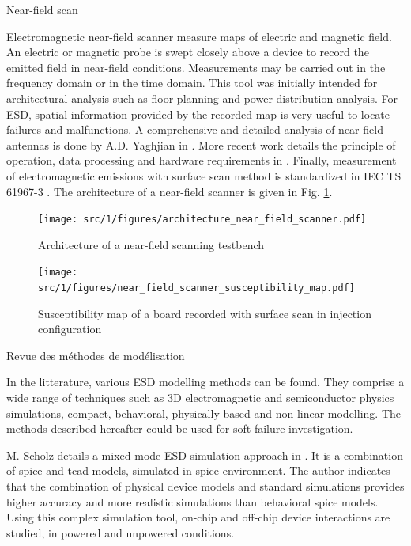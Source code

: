 Near-field scan

Electromagnetic near-field scanner measure maps of electric and magnetic field.
An electric or magnetic probe is swept closely above a device to record the emitted field in near-field conditions.
Measurements may be carried out in the frequency domain or in the time domain.
This tool was initially intended for architectural analysis such as floor-planning and power distribution analysis.
For ESD, spatial information provided by the recorded map is very useful to locate failures and malfunctions.
A comprehensive and detailed analysis of near-field antennas is done by A.D. Yaghjian in \cite{nfsFirstStudy}.
More recent work details the principle of operation, data processing and hardware requirements in \cite{near-field-scan, planarNFSAntenna, NFSMeasurements, NFScanner}.
Finally, measurement of electromagnetic emissions with surface scan method is standardized in IEC TS 61967-3 \cite{iec61967}.
The architecture of a near-field scanner is given in Fig. \ref{fig:near-field-scanner}.

\begin{figure}[!h]
  \centering
  \texttt{[image: src/1/figures/architecture\_near\_field\_scanner.pdf]}
  \caption{Architecture of a near-field scanning testbench}
  \label{fig:near-field-scanner}
\end{figure}

\begin{figure}[!h]
  \centering
  \texttt{[image: src/1/figures/near\_field\_scanner\_susceptibility\_map.pdf]}
  \caption{Susceptibility map of a board recorded with surface scan in injection configuration \cite{}}
  \label{fig:near-field-scan-map}
\end{figure}

Revue des méthodes de modélisation

In the litterature, various ESD modelling methods can be found.
They comprise a wide range of techniques such as 3D electromagnetic and semiconductor physics simulations, compact, behavioral, physically-based and non-linear modelling.
The methods described hereafter could be used for soft-failure investigation.

M. Scholz details a mixed-mode ESD simulation approach in \cite{mixedModeESDSims}.
It is a combination of \gls{spice} and \gls{tcad} models, simulated in \gls{spice} environment.
The author indicates that the combination of physical device models and standard simulations provides higher accuracy and more realistic simulations than behavioral \gls{spice} models.
Using this complex simulation tool, on-chip and off-chip device interactions are studied, in powered and unpowered conditions.

